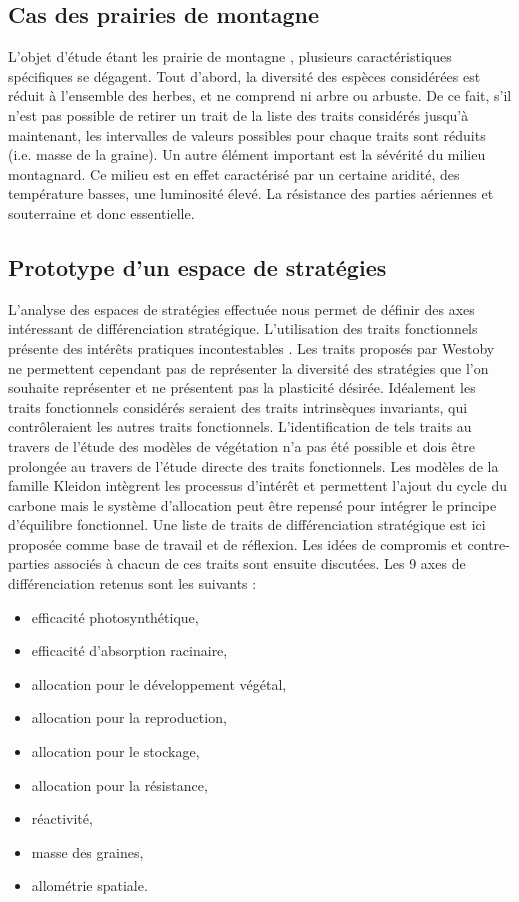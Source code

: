 \documentclass[french]{article}
\begin{document}
{\subsection{Cas des prairies de montagne}
L'objet d'étude étant les prairie de montagne , plusieurs caractéristiques spécifiques se dégagent. Tout d'abord, la diversité des espèces considérées est réduit à l'ensemble des herbes, et ne comprend ni arbre ou arbuste. De ce fait, s'il n'est pas possible de retirer un trait de la liste des traits considérés jusqu'à maintenant, les intervalles de valeurs possibles pour chaque traits sont réduits (i.e. masse de la graine). Un autre élément important est la sévérité du milieu montagnard. Ce milieu est en effet caractérisé par un certaine aridité, des température basses, une luminosité élevé. La résistance des parties aériennes et souterraine et donc essentielle. 

\subsection{Prototype d'un espace de stratégies}
L'analyse des espaces de stratégies effectuée nous permet de définir des axes intéressant de différenciation stratégique.  L'utilisation des traits fonctionnels présente des intérêts pratiques incontestables \cite{Westoby1998}. Les traits proposés par Westoby ne permettent cependant pas de représenter la diversité des stratégies que l'on souhaite représenter et ne présentent pas la plasticité désirée. Idéalement les traits fonctionnels considérés seraient des traits intrinsèques invariants, qui contrôleraient les autres traits fonctionnels. L'identification de tels traits au travers de l'étude des modèles de végétation n'a pas été possible et dois être prolongée au travers de l'étude directe des traits fonctionnels. Les modèles de la famille Kleidon intègrent les processus d'intérêt et permettent l'ajout du cycle du carbone mais le système d'allocation peut être repensé pour intégrer le principe d'équilibre fonctionnel. Une liste de traits de différenciation stratégique est ici proposée comme base de travail et de réflexion. Les idées de compromis et contre-parties associés à chacun de ces traits sont ensuite discutées. Les 9 axes de différenciation retenus sont les suivants :

\begin{itemize}
\item efficacité photosynthétique,
\item efficacité d'absorption racinaire,
\item allocation pour le développement végétal,
\item allocation pour la reproduction,
\item allocation pour le stockage,
\item allocation pour la résistance,
\item réactivité,
\item masse des graines,
\item allométrie spatiale.
\end{itemize}

}
\end{document}
